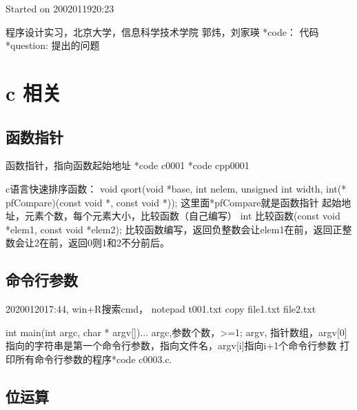 \documentclass[UTF8]{article}
\begin{document}
Started on 2002011920:23

程序设计实习，北京大学，信息科学技术学院
郭炜，刘家瑛
*code： 代码
*question: 提出的问题


\section{c 相关}
\subsection{函数指针}
函数指针，指向函数起始地址
*code c0001
*code cpp0001

c语言快速排序函数：
void qsort(void *base, int nelem, unsigned int width, int(* pfCompare)(const void *, const void *));
这里面*pfCompare就是函数指针
起始地址，元素个数，每个元素大小，比较函数（自己编写）
int 比较函数(const void *elem1, const void *elem2);
比较函数编写，返回负整数会让elem1在前，返回正整数会让2在前，返回0则1和2不分前后。

\subsection{命令行参数}
2020012017:44,
win+R搜索cmd，
notepad t001.txt
copy file1.txt file2.txt

int main(int argc, char * argv[]){...}
argc,参数个数，>=1;
argv, 指针数组，argv[0]指向的字符串是第一个命令行参数，指向文件名，argv[i]指向i+1个命令行参数
打印所有命令行参数的程序*code c0003.c.

\subsection{位运算}
\begin{comment}
与&，双目,2个1才是1
21 & 18 = 16
某位清0，或提取变量某一位。
如将int低8位清0:
n = n & 0xffffff00;
n &= 0xffffff00;
对于short的n是 n &= 0xff00;
*question: 判断int右起从0开始第7位是否是1？
看n & 0x80 是不是0x80即可。
0x80 = 1000 0000 。


或|，双目,2个0才是0
21 | 18 = 23
某些位置1，保留其余不变，
如低8位变成1其余不变，
n |= 0xffffffea



非~，单目,
~21 = 0xff



异或^，双目, 不同时取1.
21 ^ 18 = 7
某些位取反，其余不变。
n ^= 0xff
1 1 0
0 0 0
1 0 1
0 1 1
发现 a^b=c,能得到b^c=a, c^a=b, 可用于加密解密，如用秘钥b加密a。
a b --c | a b -a
b c --a | b a -b
c a --b | a b -a
如以下可实现2个变量直接交换：
a ^= b;
b ^= a;
a ^= b;


<<左移，双目
a<<b = a*2^b
a左移b位，高位丢弃，低位补0


>>右移，双目
有符号位如long, int, short, char, 右移后左边补的数和符号位相同。
无符号的补0
往小取整
-25 >> 4 = -2
-2 >> 4 = -1
18 >> 4 = 1
*code c0004

*question: 2个int的a和n=[0,31],取a的第n位。
(a>>n) & 0x0001;
(a>>n) & 1;
或者： (a & (1<<n))>> n
\end{comment}
\end{document}
